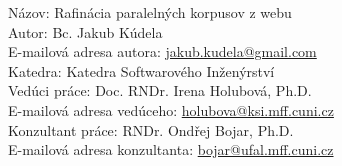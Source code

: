 
\frenchspacing

Názov: Rafinácia paralelných korpusov z webu \\
Autor: Bc. Jakub Kúdela \\
E-mailová adresa autora: \url{jakub.kudela@gmail.com} \\
Katedra: Katedra Softwarového Inženýrství \\
Vedúci práce: Doc. RNDr. Irena Holubová, Ph.D. \\
E-mailová adresa vedúceho: \url{holubova@ksi.mff.cuni.cz} \\
Konzultant práce: RNDr. Ondřej Bojar, Ph.D. \\
E-mailová adresa konzultanta: \url{bojar@ufal.mff.cuni.cz}

